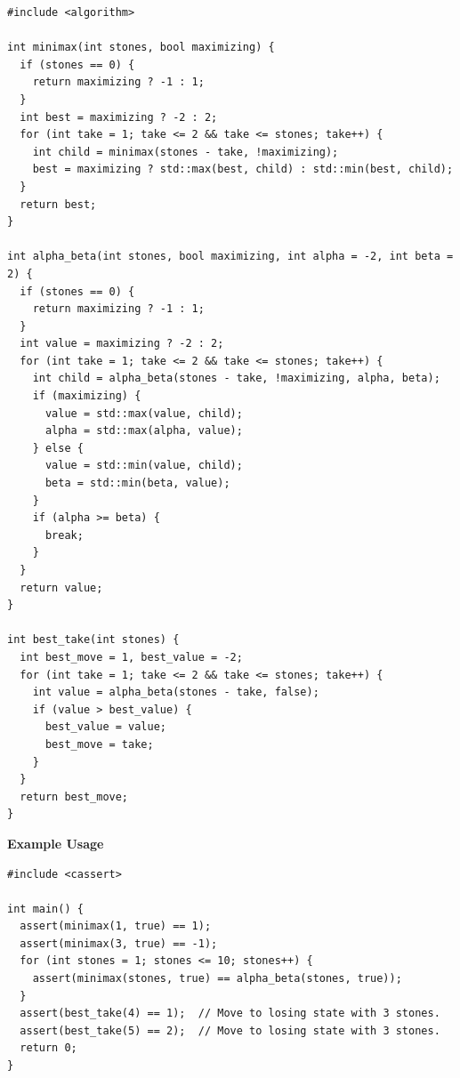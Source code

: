 \begin{lstlisting}[style=cpp]
#include <algorithm>

int minimax(int stones, bool maximizing) {
  if (stones == 0) {
    return maximizing ? -1 : 1;
  }
  int best = maximizing ? -2 : 2;
  for (int take = 1; take <= 2 && take <= stones; take++) {
    int child = minimax(stones - take, !maximizing);
    best = maximizing ? std::max(best, child) : std::min(best, child);
  }
  return best;
}

int alpha_beta(int stones, bool maximizing, int alpha = -2, int beta = 2) {
  if (stones == 0) {
    return maximizing ? -1 : 1;
  }
  int value = maximizing ? -2 : 2;
  for (int take = 1; take <= 2 && take <= stones; take++) {
    int child = alpha_beta(stones - take, !maximizing, alpha, beta);
    if (maximizing) {
      value = std::max(value, child);
      alpha = std::max(alpha, value);
    } else {
      value = std::min(value, child);
      beta = std::min(beta, value);
    }
    if (alpha >= beta) {
      break;
    }
  }
  return value;
}

int best_take(int stones) {
  int best_move = 1, best_value = -2;
  for (int take = 1; take <= 2 && take <= stones; take++) {
    int value = alpha_beta(stones - take, false);
    if (value > best_value) {
      best_value = value;
      best_move = take;
    }
  }
  return best_move;
}
\end{lstlisting}
\textbf{Example Usage}\par
\begin{lstlisting}[style=cpp]
#include <cassert>

int main() {
  assert(minimax(1, true) == 1);
  assert(minimax(3, true) == -1);
  for (int stones = 1; stones <= 10; stones++) {
    assert(minimax(stones, true) == alpha_beta(stones, true));
  }
  assert(best_take(4) == 1);  // Move to losing state with 3 stones.
  assert(best_take(5) == 2);  // Move to losing state with 3 stones.
  return 0;
}
\end{lstlisting}
